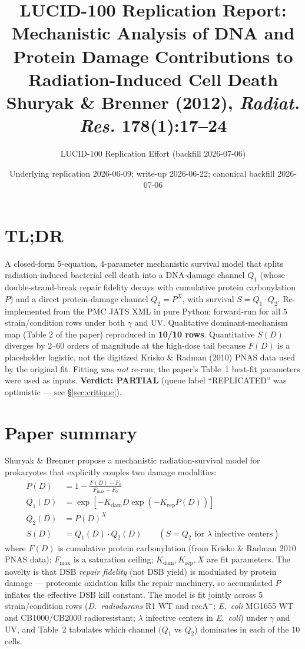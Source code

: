 \documentclass[11pt]{article}
\title{LUCID-100 Replication Report:\\
Mechanistic Analysis of DNA and Protein Damage Contributions to Radiation-Induced Cell Death\\
\large Shuryak \& Brenner (2012), \emph{Radiat. Res.} 178(1):17--24}
\author{LUCID-100 Replication Effort (backfill 2026-07-06)}
\date{Underlying replication 2026-06-09; write-up 2026-06-22; canonical backfill 2026-07-06}
\begin{document}
\maketitle

\section*{TL;DR}
A closed-form 5-equation, 4-parameter mechanistic survival model that splits radiation-induced
bacterial cell death into a DNA-damage channel $Q_1$ (whose double-strand-break repair fidelity
decays with cumulative protein carbonylation $P$) and a direct protein-damage channel
$Q_2 = P^X$, with survival $S = Q_1 \cdot Q_2$. Re-implemented from the PMC JATS XML in pure
Python; forward-run for all 5 strain/condition rows under both $\gamma$ and UV. Qualitative
dominant-mechanism map (Table 2 of the paper) reproduced in \textbf{10/10 rows}. Quantitative
$S(D)$ diverges by 2--60 orders of magnitude at the high-dose tail because $F(D)$ is a
placeholder logistic, not the digitized Krisko \& Radman (2010) PNAS data used by the
original fit. Fitting was \emph{not} re-run; the paper's Table~1 best-fit parameters were used
as inputs. \textbf{Verdict: PARTIAL} (queue label ``REPLICATED'' was optimistic --- see
\S\ref{sec:critique}).

\section{Paper summary}
Shuryak \& Brenner propose a mechanistic radiation-survival model for prokaryotes that
explicitly couples two damage modalities:
\begin{align}
P(D)   &= 1 - \frac{F(D) - F_0}{F_{\max} - F_0} \\
Q_1(D) &= \exp\left[-K_{\text{dam}} D \exp(-K_{\text{rep}} P(D))\right] \\
Q_2(D) &= P(D)^X \\
S(D)   &= Q_1(D) \cdot Q_2(D) \qquad (S = Q_2 \text{ for } \lambda \text{ infective centers})
\end{align}
where $F(D)$ is cumulative protein carbonylation (from Krisko \& Radman 2010 PNAS data);
$F_{\max}$ is a saturation ceiling; $K_{\text{dam}}, K_{\text{rep}}, X$ are fit parameters.
The novelty is that DSB \emph{repair fidelity} (not DSB yield) is modulated by protein damage
--- proteomic oxidation kills the repair machinery, so accumulated $P$ inflates the effective
DSB kill constant. The model is fit jointly across 5 strain/condition rows
(\textit{D.~radiodurans} R1 WT and recA$^-$; \textit{E.~coli} MG1655 WT and CB1000/CB2000
radioresistant; $\lambda$ infective centers in \textit{E.~coli}) under $\gamma$ and UV, and
Table~2 tabulates which channel ($Q_1$ vs $Q_2$) dominates in each of the 10 cells.
\end{document}

